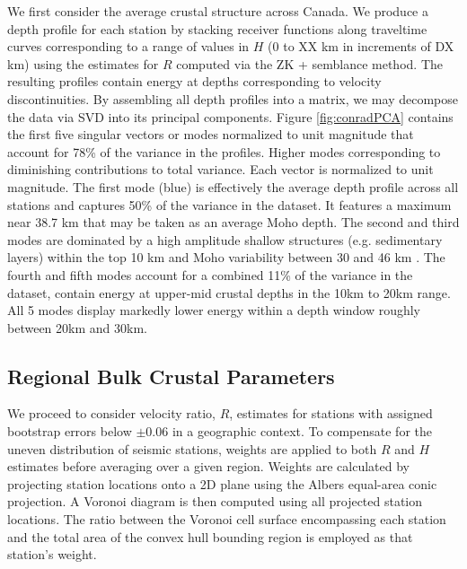 \documentclass[draft, 12pt]{article}
\begin{document}
We first consider the average crustal structure across Canada. We produce a depth profile for each station by stacking receiver functions along traveltime curves corresponding to a range of values in $H$ (0 to XX km in increments of DX km)  using the estimates for $R$ computed via the ZK + semblance method. The resulting profiles contain energy at depths corresponding to velocity discontinuities. By assembling all depth profiles into a matrix, we may decompose the data via SVD into its principal components. Figure \ref{fig:conradPCA} contains the first five singular vectors or modes normalized to unit magnitude that account for 78\% of the variance in the profiles. Higher modes corresponding to diminishing contributions to total variance. Each vector is normalized to unit magnitude. The first mode (blue) is effectively the average depth profile across all stations and captures 50\% of the variance in the dataset. It features a maximum near 38.7 km that may be taken as an average Moho depth. The second and third modes are dominated by a high amplitude shallow structures (e.g. sedimentary layers) within the top 10 km and Moho variability between 30 and 46 km . The fourth and fifth modes account for a combined 11\% of the variance in the dataset, contain energy at upper-mid crustal depths in the 10km to 20km range. All 5 modes display markedly lower energy within a depth window roughly between 20km and 30km.

\subsection{Regional Bulk Crustal Parameters}

We proceed to consider velocity ratio, $R$, estimates for stations with assigned bootstrap errors below $\pm 0.06$ in a geographic context. To compensate for the uneven distribution of seismic stations, weights are applied to both $R$ and $H$ estimates before averaging over a given region. Weights are calculated by projecting station locations onto a 2D plane using the Albers equal-area conic projection. A Voronoi diagram is then computed using all projected station locations. The ratio between the Voronoi cell surface encompassing each station and the total area of the convex hull bounding region is employed as that station's weight.
\end{document}
